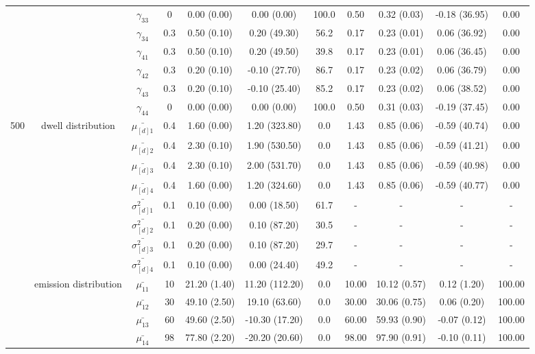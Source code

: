 \begin{table}[h]
{\begin{tabular}{ccccccccccc}
 &  & $\gamma_{33}$ & 0 & 0.00 (0.00) & 0.00 (0.00) & 100.0 & 0.50 & 0.32 (0.03) & -0.18 (36.95) & 0.00 \\
 &  & $\gamma_{34}$ & 0.3 & 0.50 (0.10) & 0.20 (49.30) & 56.2 & 0.17 & 0.23 (0.01) & 0.06 (36.92) & 0.00 \\
 &  & $\gamma_{41}$ & 0.3 & 0.50 (0.10) & 0.20 (49.50) & 39.8 & 0.17 & 0.23 (0.01) & 0.06 (36.45) & 0.00 \\
 &  & $\gamma_{42}$ & 0.3 & 0.20 (0.10) & -0.10 (27.70) & 86.7 & 0.17 & 0.23 (0.02) & 0.06 (36.79) & 0.00 \\
 &  & $\gamma_{43}$ & 0.3 & 0.20 (0.10) & -0.10 (25.40) & 85.2 & 0.17 & 0.23 (0.02) & 0.06 (38.52) & 0.00 \\
 &  & $\gamma_{44}$ & 0 & 0.00 (0.00) & 0.00 (0.00) & 100.0 & 0.50 & 0.31 (0.03) & -0.19 (37.45) & 0.00 \\ \midrule
500 & dwell distribution & $\bar{\mu_{[d]1}}$ & 0.4 & 1.60 (0.00) & 1.20 (323.80) & 0.0 & 1.43 & 0.85 (0.06) & -0.59 (40.74) & 0.00 \\
\multirow{39}{*}{} & \multirow{7}{*}{} & $\bar{\mu_{[d]2}}$ & 0.4 & 2.30 (0.10) & 1.90 (530.50) & 0.0 & 1.43 & 0.85 (0.06) & -0.59 (41.21) & 0.00 \\
 &  & $\bar{\mu_{[d]3}}$ & 0.4 & 2.30 (0.10) & 2.00 (531.70) & 0.0 & 1.43 & 0.85 (0.06) & -0.59 (40.98) & 0.00 \\
 &  & $\bar{\mu_{[d]4}}$ & 0.4 & 1.60 (0.00) & 1.20 (324.60) & 0.0 & 1.43 & 0.85 (0.06) & -0.59 (40.77) & 0.00 \\
 &  & $\bar{\sigma^2_{[d]1}}$ & 0.1 & 0.10 (0.00) & 0.00 (18.50) & 61.7 & - & - & - & - \\
 &  & $\bar{\sigma^2_{[d]2}}$ & 0.1 & 0.20 (0.00) & 0.10 (87.20) & 30.5 & - & - & - & - \\
 &  & $\bar{\sigma^2_{[d]3}}$ & 0.1 & 0.20 (0.00) & 0.10 (87.20) & 29.7 & - & - & - & - \\
 &  & $\bar{\sigma^2_{[d]4}}$ & 0.1 & 0.10 (0.00) & 0.00 (24.40) & 49.2 & - & - & - & - \\
 & emission distribution & $\bar{\mu_{11}}$ & 10 & 21.20 (1.40) & 11.20 (112.20) & 0.0 & 10.00 & 10.12 (0.57) & 0.12 (1.20) & 100.00 \\
 & \multirow{15}{*}{} & $\bar{\mu_{12}}$ & 30 & 49.10 (2.50) & 19.10 (63.60) & 0.0 & 30.00 & 30.06 (0.75) & 0.06 (0.20) & 100.00 \\
 &  & $\bar{\mu_{13}}$ & 60 & 49.60 (2.50) & -10.30 (17.20) & 0.0 & 60.00 & 59.93 (0.90) & -0.07 (0.12) & 100.00 \\
 &  & $\bar{\mu_{14}}$ & 98 & 77.80 (2.20) & -20.20 (20.60) & 0.0 & 98.00 & 97.90 (0.91) & -0.10 (0.11) & 100.00 \\

\end{tabular}}
\end{table}

